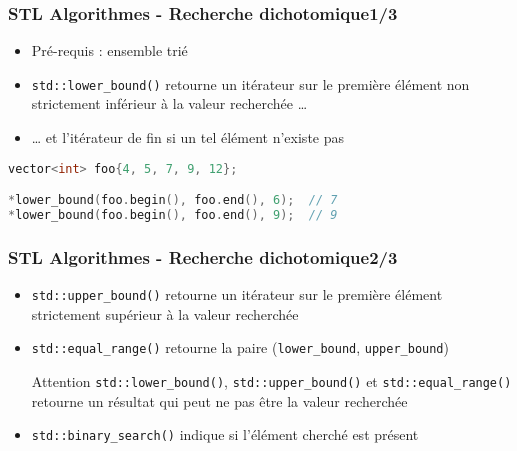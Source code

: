 \documentclass[C++.tex]{subfiles}
\begin{document}
\begin{frame}[fragile]
	\frametitle{STL Algorithmes - Recherche dichotomique\titlehfill{}1/3}
	\begin{itemize}
		\item Pré-requis : ensemble trié
		\item \lstinline|std::lower_bound()| retourne un itérateur sur le première élément non strictement inférieur à la valeur recherchée \ldots


		\item \ldots{} et l'itérateur de fin si un tel élément n'existe pas
	\end{itemize}

	\begin{lstlisting}[language=C++]
vector<int> foo{4, 5, 7, 9, 12};

*lower_bound(foo.begin(), foo.end(), 6);  // 7
*lower_bound(foo.begin(), foo.end(), 9);  // 9\end{lstlisting}
\end{frame}

\begin{frame}[fragile]
	\frametitle{STL Algorithmes - Recherche dichotomique\titlehfill{}2/3}
	\begin{itemize}
		\item \lstinline|std::upper_bound()| retourne un itérateur sur le première élément strictement supérieur à la valeur recherchée 
		\item \lstinline|std::equal_range()| retourne la paire (\lstinline|lower_bound|, \lstinline|upper_bound|)

		\begin{alertblock}{Attention}
			\lstinline|std::lower_bound()|, \lstinline|std::upper_bound()| et \lstinline|std::equal_range()| retourne un résultat qui peut ne pas être la valeur recherchée
		\end{alertblock}

		\item \lstinline|std::binary_search()| indique si l'élément cherché est présent
	\end{itemize}
\end{frame}
\end{document}
